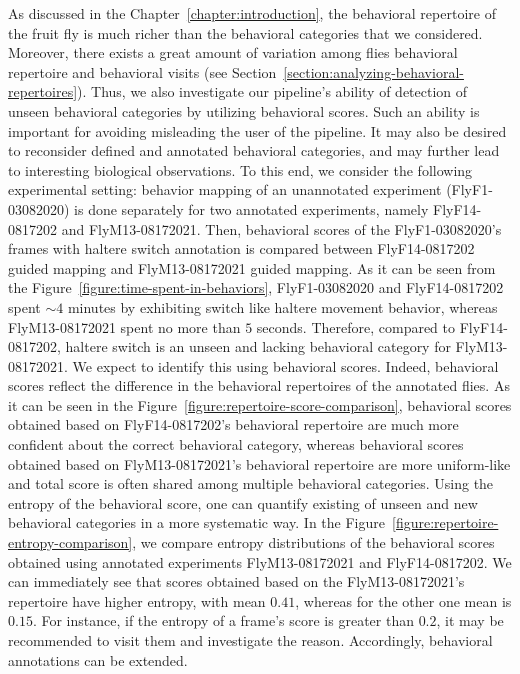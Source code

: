 As discussed in the Chapter~\ref{chapter:introduction}, the behavioral repertoire of the fruit fly is much richer than the behavioral categories that we considered.
Moreover, there exists a great amount of variation among flies behavioral repertoire and behavioral visits (see Section~\ref{section:analyzing-behavioral-repertoires}).
Thus, we also investigate our pipeline's ability of detection of unseen behavioral categories by utilizing behavioral scores.
Such an ability is important for avoiding misleading the user of the pipeline. It may also be desired to reconsider defined and annotated behavioral categories, and may further lead to interesting biological observations.
To this end, we consider the following experimental setting: behavior mapping of an unannotated experiment (FlyF1-03082020) is done separately for two annotated experiments, namely FlyF14-0817202 and FlyM13-08172021.
Then, behavioral scores of the FlyF1-03082020's frames with haltere switch annotation is compared between FlyF14-0817202 guided mapping and FlyM13-08172021 guided mapping.
As it can be seen from the Figure~\ref{figure:time-spent-in-behaviors}, FlyF1-03082020 and FlyF14-0817202 spent ${\sim}4$ minutes by exhibiting switch like haltere movement behavior, whereas FlyM13-08172021 spent no more than $5$ seconds.
Therefore, compared to FlyF14-0817202, haltere switch is an unseen and lacking behavioral category for FlyM13-08172021.
We expect to identify this using behavioral scores.
Indeed, behavioral scores reflect the difference in the behavioral repertoires of the annotated flies.
As it can be seen in the Figure~\ref{figure:repertoire-score-comparison}, behavioral scores obtained based on FlyF14-0817202's behavioral repertoire are much more confident about the correct behavioral category, whereas behavioral scores obtained based on FlyM13-08172021's behavioral repertoire are more uniform-like and total score is often shared among multiple behavioral categories.
Using the entropy of the behavioral score, one can quantify existing of unseen and new behavioral categories in a more systematic way.
In the Figure~\ref{figure:repertoire-entropy-comparison}, we compare entropy distributions of the behavioral scores obtained using annotated experiments FlyM13-08172021 and FlyF14-0817202.
We can immediately see that scores obtained based on the FlyM13-08172021's repertoire have higher entropy, with mean $0.41$, whereas for the other one mean is $0.15$.
For instance, if the entropy of a frame's score is greater than $0.2$, it may be recommended to visit them and investigate the reason.
Accordingly, behavioral annotations can be extended.

